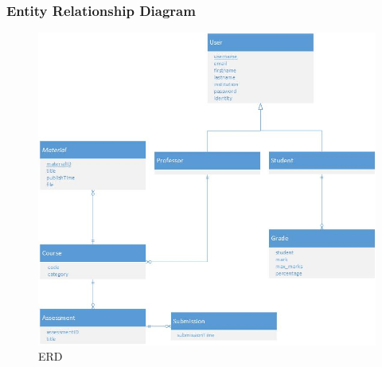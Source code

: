 \documentclass{beamer}
\begin{document}
\begin{frame}
	\frametitle{Entity Relationship Diagram}
	\begin{figure}[!ht]
		\begin{center}
			\includegraphics[width=\textwidth,height=0.7\textheight,keepaspectratio]{erd}
		\end{center}
		\caption{ERD}
	\end{figure}
	
\end{frame}
\end{document}
